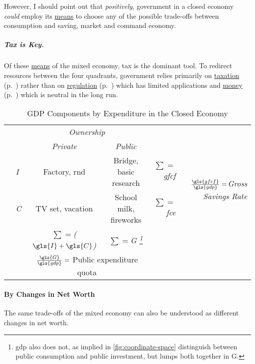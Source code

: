 However, I should point out that \emph{positively}, government in a closed economy \emph{could} employ its \hyperref[sec:means]{means} to choose any of the possible trade-offs between consumption and saving, market and command economy.

\subparagraph[Tax is Key]{Tax is Key.}
Of these \hyperref[sec:means]{means} of the mixed economy, tax is the dominant tool.
To redirect resources between the four quadrants, government relies primarily on \hyperref[sec:fiscal]{taxation} (p.~\pageref{sec:fiscal}) rather than on \hyperref[sec:regulatory]{regulation} (p.~\pageref{sec:regulatory}) which has limited applications and \hyperref[sec:monetary]{money} (p.~\pageref{sec:monetary}) which is neutral in the long run.

\begin{landscape}
\begin{table}
	\caption{GDP Components by Expenditure in the Closed Economy}
	\label{tab:GDP-Comp-Exp}
	\small
	\begin{center}
	\renewcommand{\arraystretch}{1.5}
	\begin{tabular}{llccrr}
		\toprule
		& & \multicolumn{2}{c}{\emph{Ownership}} & &\\
		\cmidrule(r){3-4}
		& &\emph{Private} & \emph{Public}& &\\
		\midrule
		\multirow{2}{*}{\emph{}} & \emph{\gls{I}} & Factory,  \gls{rnd} & Bridge, basic research & \emph{$\sum=$\gls{gfcf}} & \multirow{2}{*}{\emph{$\frac{\gls{gfcf}}{\gls{gdp}}=$Gross Savings Rate}}\\
		& \emph{\gls{C}} & TV set, vacation & School milk, fireworks & \emph{$\sum=$\gls{fce}}  \\
		\midrule
		& &\emph{$\sum=$($\gls{I}+\gls{C}$)} & \emph{$\sum=$\gls{G}
		\footnote{
			\Gls{gdp} also does not, as implied in \autoref{fig:coordinate-space} distinguish between public consumption and public investment, but lumps both together in \gls{G}.
		}}\\
		\cmidrule(r){3-4}
		& & \multicolumn{2}{c}{$\frac{\gls{G}}{\gls{gdp}}=$ Public expenditure quota} \\
		\bottomrule
	\end{tabular}
	\end{center}
\end{table}
\end{landscape}

\paragraph{By Changes in Net Worth}
	\label{sec:delta-net-worth}
The same trade-offs of the mixed economy can also be understood as different changes in net worth.

